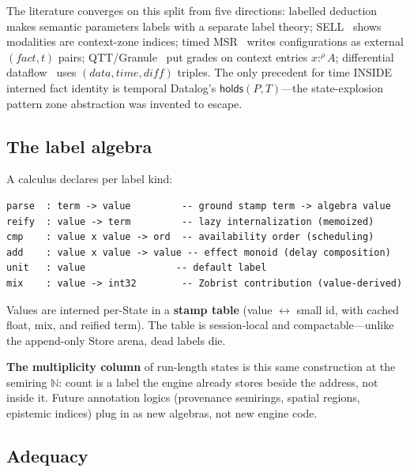 \documentclass[11pt]{article}
\newcommand{\N}{\mathbb{N}}
\theoremstyle{remark}
\begin{document}
The literature converges on this split from five directions: labelled
deduction~\cite{Gabbay96,Negri05} makes semantic parameters labels with a
separate label theory; SELL~\cite{NigamOlartePimentel17} shows modalities are
context-zone indices; timed MSR~\cite{KanovichKiriginNigamScedrovTalcott16}
writes configurations as external $(\mathit{fact}, t)$ pairs;
QTT/Granule~\cite{Atkey18,OrchardLiepeltEades19} put grades on context entries
$x :^\rho A$; differential dataflow~\cite{MurrayMcsherry13} uses
$(\mathit{data}, \mathit{time}, \mathit{diff})$ triples.  The only precedent for
time INSIDE interned fact identity is temporal Datalog's $\mathsf{holds}(P, T)$---the
state-explosion pattern zone abstraction was invented to escape.

\subsection{The label algebra}
\label{sec:label-algebra}

A calculus declares per label kind:

\begin{lstlisting}
parse  : term -> value         -- ground stamp term -> algebra value
reify  : value -> term         -- lazy internalization (memoized)
cmp    : value x value -> ord  -- availability order (scheduling)
add    : value x value -> value -- effect monoid (delay composition)
unit   : value                -- default label
mix    : value -> int32        -- Zobrist contribution (value-derived)
\end{lstlisting}

Values are interned per-State in a \textbf{stamp table} (value $\leftrightarrow$
small id, with cached float, mix, and reified term).  The table is session-local
and compactable---unlike the append-only Store arena, dead labels die.

\textbf{The multiplicity column} of run-length states is this same construction
at the semiring $\N$: count is a label the engine already stores beside the
address, not inside it.  Future annotation logics (provenance semirings, spatial
regions, epistemic indices) plug in as new algebras, not new engine code.

\subsection{Adequacy}
\label{sec:adequacy}
\end{document}
